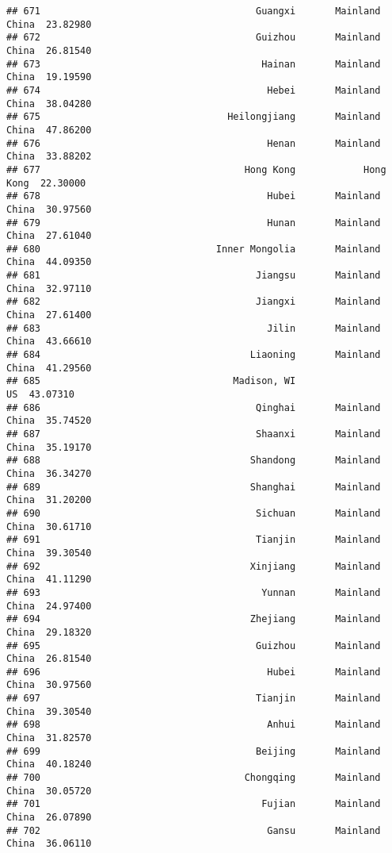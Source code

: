 \documentclass[
]{article}
\begin{document}
\begin{verbatim}
## 671                                      Guangxi       Mainland China  23.82980
## 672                                      Guizhou       Mainland China  26.81540
## 673                                       Hainan       Mainland China  19.19590
## 674                                        Hebei       Mainland China  38.04280
## 675                                 Heilongjiang       Mainland China  47.86200
## 676                                        Henan       Mainland China  33.88202
## 677                                    Hong Kong            Hong Kong  22.30000
## 678                                        Hubei       Mainland China  30.97560
## 679                                        Hunan       Mainland China  27.61040
## 680                               Inner Mongolia       Mainland China  44.09350
## 681                                      Jiangsu       Mainland China  32.97110
## 682                                      Jiangxi       Mainland China  27.61400
## 683                                        Jilin       Mainland China  43.66610
## 684                                     Liaoning       Mainland China  41.29560
## 685                                  Madison, WI                   US  43.07310
## 686                                      Qinghai       Mainland China  35.74520
## 687                                      Shaanxi       Mainland China  35.19170
## 688                                     Shandong       Mainland China  36.34270
## 689                                     Shanghai       Mainland China  31.20200
## 690                                      Sichuan       Mainland China  30.61710
## 691                                      Tianjin       Mainland China  39.30540
## 692                                     Xinjiang       Mainland China  41.11290
## 693                                       Yunnan       Mainland China  24.97400
## 694                                     Zhejiang       Mainland China  29.18320
## 695                                      Guizhou       Mainland China  26.81540
## 696                                        Hubei       Mainland China  30.97560
## 697                                      Tianjin       Mainland China  39.30540
## 698                                        Anhui       Mainland China  31.82570
## 699                                      Beijing       Mainland China  40.18240
## 700                                    Chongqing       Mainland China  30.05720
## 701                                       Fujian       Mainland China  26.07890
## 702                                        Gansu       Mainland China  36.06110

\end{verbatim}
\end{document}
